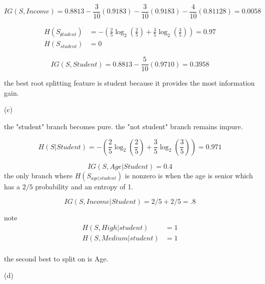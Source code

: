 \documentclass{report}
\begin{document}
\begin{equation}
    IG(S,Income)=0.8813-\frac{3}{10}(0.9183) - \frac{3}{10}(0.9183) - \frac{4}{10}(0.81128) = 0.0058
\end{equation}

\begin{equation}
    \begin{split}
        H(S_{\not student}) &= -\left( \frac{2}{5}\log_2(\frac{2}{5}) + \frac{3}{5}\log_2(\frac{3}{5})  \right)= 0.97\\
        H(S_{ student}) &= 0 
    \end{split}
\end{equation}

\begin{equation}
    IG(S,Student)=0.8813-\frac{5}{10}(0.9710) = 0.3958
\end{equation}

the best root splitting feature is student because it provides the most information gain.

(c)

the "student" branch becomes pure. the "not student" branch remains impure. 

\begin{equation}
    H(S|Student) = -\left( \frac{2}{5}\log_2(\frac{2}{5})  + \frac{3}{5}\log_2(\frac{3}{5})  \right) = 0.971
\end{equation}

\begin{equation}
    IG(S,Age | Student) = 0.4
\end{equation}
the only branch where \(H(S_{age|student})\) is nonzero is when the age is senior which has a \(2/5\) probability and an entropy of 1.

\begin{equation}
    IG(S,Income | Student) = 2/5+2/5 = .8
\end{equation}

note
\begin{equation}\begin{split}
        H(S,High|student) &= 1\\
        H(S,Medium|student) &= 1\\
\end{split}
\end{equation}

the second best to split on is Age. 

(d)
\end{document}
